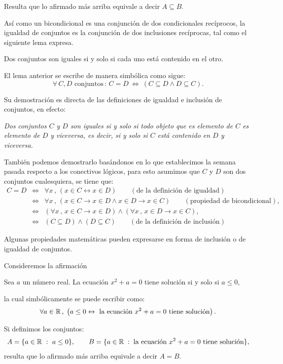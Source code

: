 Resulta que lo afirmado más arriba equivale a decir $A\subseteq B.$

Así como un bicondicional es una conjunción de dos condicionales recíprocos, 
la igualdad de conjuntos es la conjunción de dos inclusiones recíprocas, 
tal como el siguiente lema expresa.

\medskip

\begin{lem}
	Dos conjuntos son iguales si y solo si cada uno está contenido en el otro.
\end{lem}

\medskip


El lema anterior se escribe de manera simbólica como sigue:
$$\forall\, C,D \textrm{ conjuntos}\,:\, C=D\ 
\Leftrightarrow\  
\left(C\subseteq D\wedge D\subseteq C\right).$$

Su demostración es directa de las definiciones de igualdad e inclusi\'on 
de conjuntos, en efecto:

{\em Dos conjuntos $C$ y $D$ son iguales si y solo si todo objeto que es elemento 
	de $C$ es elemento de $D$ y viceversa, es decir, 
	si y solo si $C$ está contenido en $D$ y viceversa.}

También podemos demostrarlo basándonos en lo que establecimos 
la semana pasada respecto a los conectivos lógicos, 
para esto asumimos que $C$ y $D$ son dos conjuntos cualesquiera, 
se tiene que:
\begin{eqnarray*}
	C=D &\Leftrightarrow& \forall x\,,\, 
	\left( x\in C \leftrightarrow x\in D\right)
	\qquad (\textrm{de la definición de igualdad})\\
	& \Leftrightarrow& \forall x \,,\,
	\left( x\in C \rightarrow x\in D\wedge x\in D \rightarrow x\in C\right)
	\qquad (\textrm{propiedad de bicondicional}),\\
	& \Leftrightarrow& \left(\forall x \,,\, 
	x\in C \rightarrow x\in D\right) \wedge 
	\left(\forall x\,,\, x\in D \rightarrow x\in C\right),\\
	& \Leftrightarrow&
	\left(C\subseteq D\right)\wedge \left(D\subseteq C\right) 
	\qquad (\textrm{de la definición de inclusión})
\end{eqnarray*}

Algunas propiedades matemáticas pueden expresarse 
en forma de inclusión o de igualdad 
de conjuntos. 

\medskip


\begin{ejemplo} 
	
Consideremos la afirmaci\'on\\

\centerline{Sea $a$ un n\'umero real.
	La ecuaci\'on $x^2+a=0$ tiene soluci\'on si y solo si $a \le 0$,}

la cual simbólicamente se puede escribir como:
$$\forall a\in \mathbb{R}\, ,\; 
\left(a\le 0\leftrightarrow \mbox{ la ecuaci\'on } x^2+a=0 \mbox{ tiene soluci\'on}\right).$$

Si definimos los conjuntos:
\[ 
	A = \{a \in \mathbb{R}\ :\ a \le 0\},\qquad 
	B = \{a \in \mathbb{R}\;:\;\mbox{la ecuaci\'on } x^2 + a = 0 \mbox{ tiene soluci\'on}\},
\]
resulta que lo afirmado más arriba equivale a decir $A = B$.
\end{ejemplo}

